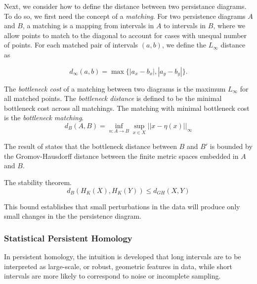 Next, we consider how to define the distance between two persistance diagrams.
To do so, we first need the concept of a \emph{matching}.
For two persistence diagrams $A$ and $B$, a matching is a mapping from intervals in $A$ to intervals in $B$, where we allow points to match to the diagonal to account for cases with unequal number of points.
For each matched pair of intervals $(a,b)$, we define the $L_{\infty}$ distance as

\begin{equation}
d_{\infty}(a,b) = \max\{ |a_{x}-b_{x}|, |a_{y}-b_{y}| \}.
\end{equation}


\begin{defn}
\label{defn:bottleneck}
The \emph{bottleneck cost} of a matching between two diagrams is the maximum $L_{\infty}$ for all matched points. The \emph{bottleneck distance} is defined to be the minimal bottleneck cost across all matchings. The matching with minimal bottleneck cost is the \emph{bottleneck matching}.
\begin{equation}
d_{B}(A,B) = \inf_{n:A\rightarrow B} \sup_{x\in X} ||x-\eta(x)||_{\infty}
\end{equation}
\end{defn}

The result of \citet{Chazal:2009wc} states that the bottleneck distance between $B$ and $B'$ is bounded by the Gromov-Hausdorff distance between the finite metric spaces embedded in $A$ and $B$.

\begin{thm}
\label{thm:stability}
The stability theorem.
\begin{equation}
d_{B}(H_{K}(X),H_{K}(Y)) \leq d_{GH}(X,Y)
\end{equation}
\end{thm}

This bound establishes that small perturbations in the data will produce only small changes in the the persistence diagram.

\subsubsection{Statistical Persistent Homology}
\label{subsubsec:ph_statistics}

In persistent homology, the intuition is developed that long intervals are to be interpreted as large-scale, or robust, geometric features in data, while short intervals are more likely to correspond to noise or incomplete sampling.

